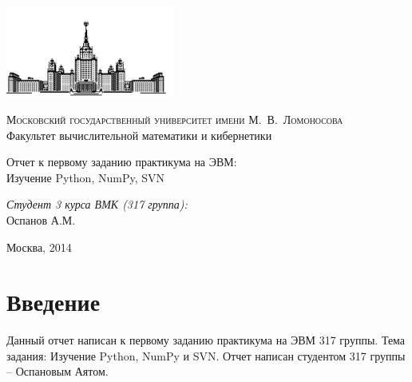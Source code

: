 \documentclass[12pt, a4paper]{article}
\begin{document}
	\thispagestyle{empty}

	\begin{singlespace}
	\begin{titlepage}
		\begin{center}
			\includegraphics[height = 3cm]{msu.png}

			{\scshape Московский государственный университет имени М.~В.~Ломоносова}\\
			Факультет вычислительной математики и кибернетики\\
			\centerline{\hfill\hrulefill\hrulefill\hrulefill\hrulefill\hfill}

			\vfill

			{\LARGE Отчет к первому заданию практикума на ЭВМ: \\ Изучение Python, NumPy, SVN}

			\vspace{1cm}

		\end{center}

		\vfill
		\begin{flushright}
			\textit{Студент 3 курса ВМК (317 группа):}\\
				Оспанов А.М.

			\vspace{5mm}

		\end{flushright}

		\vfill

		\begin{center}
		Москва, 2014
		\end{center}
	\end{titlepage}
	\end{singlespace}

	\tableofcontents


	\newpage
	\section{Введение}
		Данный отчет написан к первому заданию практикума на ЭВМ 317 группы. Тема задания: Изучение Python, NumPy и SVN. Отчет написан студентом 317 группы -- Оспановым Аятом.
\end{document}
